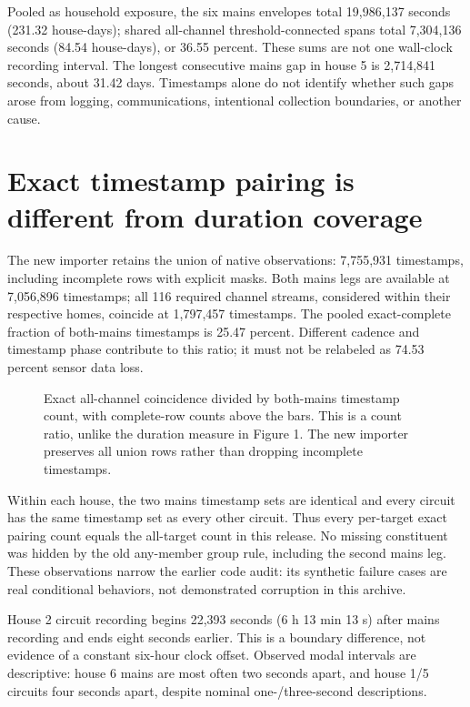 \documentclass[11pt,letterpaper]{article}
\begin{document}
Pooled as household exposure, the six mains envelopes total 19,986,137 seconds (231.32 house-days); shared all-channel threshold-connected spans total 7,304,136 seconds (84.54 house-days), or 36.55 percent. These sums are not one wall-clock recording interval. The longest consecutive mains gap in house 5 is 2,714,841 seconds, about 31.42 days. Timestamps alone do not identify whether such gaps arose from logging, communications, intentional collection boundaries, or another cause.

\clearpage
\section{Exact timestamp pairing is different from duration coverage}
The new importer retains the union of native observations: 7,755,931 timestamps, including incomplete rows with explicit masks. Both mains legs are available at 7,056,896 timestamps; all 116 required channel streams, considered within their respective homes, coincide at 1,797,457 timestamps. The pooled exact-complete fraction of both-mains timestamps is 25.47 percent. Different cadence and timestamp phase contribute to this ratio; it must not be relabeled as 74.53 percent sensor data loss. \cite{ref14}
\begin{figure}[H]\centering

\caption{Exact all-channel coincidence divided by both-mains timestamp count, with complete-row counts above the bars. This is a count ratio, unlike the duration measure in Figure 1. The new importer preserves all union rows rather than dropping incomplete timestamps.}
\end{figure}
Within each house, the two mains timestamp sets are identical and every circuit has the same timestamp set as every other circuit. Thus every per-target exact pairing count equals the all-target count in this release. No missing constituent was hidden by the old any-member group rule, including the second mains leg. These observations narrow the earlier code audit: its synthetic failure cases are real conditional behaviors, not demonstrated corruption in this archive.

House 2 circuit recording begins 22,393 seconds (6 h 13 min 13 s) after mains recording and ends eight seconds earlier. This is a boundary difference, not evidence of a constant six-hour clock offset. Observed modal intervals are descriptive: house 6 mains are most often two seconds apart, and house 1/5 circuits four seconds apart, despite nominal one-/three-second descriptions.
\end{document}
